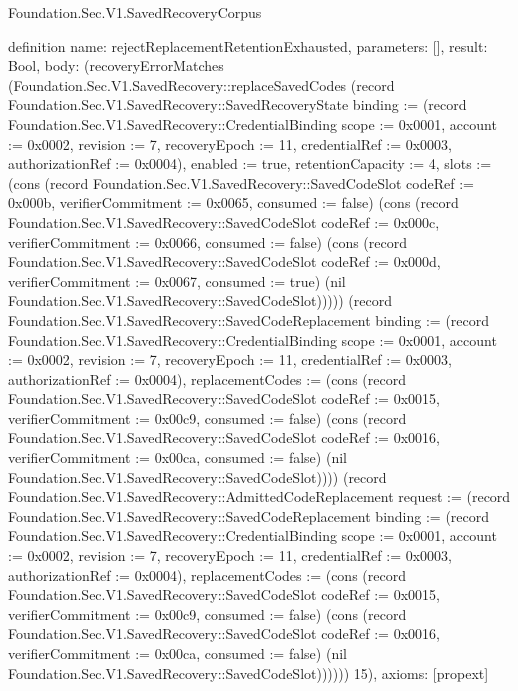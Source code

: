 \begin{lexlean}{Foundation.Sec.V1.SavedRecoveryCorpus}
\begin{semanticmodule}
definition{
  name: rejectReplacementRetentionExhausted,
  parameters: [],
  result: Bool,
  body: (recoveryErrorMatches (Foundation.Sec.V1.SavedRecovery::replaceSavedCodes (record Foundation.Sec.V1.SavedRecovery::SavedRecoveryState {binding := (record Foundation.Sec.V1.SavedRecovery::CredentialBinding {scope := 0x0001, account := 0x0002, revision := 7, recoveryEpoch := 11, credentialRef := 0x0003, authorizationRef := 0x0004}), enabled := true, retentionCapacity := 4, slots := (cons (record Foundation.Sec.V1.SavedRecovery::SavedCodeSlot {codeRef := 0x000b, verifierCommitment := 0x0065, consumed := false}) (cons (record Foundation.Sec.V1.SavedRecovery::SavedCodeSlot {codeRef := 0x000c, verifierCommitment := 0x0066, consumed := false}) (cons (record Foundation.Sec.V1.SavedRecovery::SavedCodeSlot {codeRef := 0x000d, verifierCommitment := 0x0067, consumed := true}) (nil Foundation.Sec.V1.SavedRecovery::SavedCodeSlot))))}) (record Foundation.Sec.V1.SavedRecovery::SavedCodeReplacement {binding := (record Foundation.Sec.V1.SavedRecovery::CredentialBinding {scope := 0x0001, account := 0x0002, revision := 7, recoveryEpoch := 11, credentialRef := 0x0003, authorizationRef := 0x0004}), replacementCodes := (cons (record Foundation.Sec.V1.SavedRecovery::SavedCodeSlot {codeRef := 0x0015, verifierCommitment := 0x00c9, consumed := false}) (cons (record Foundation.Sec.V1.SavedRecovery::SavedCodeSlot {codeRef := 0x0016, verifierCommitment := 0x00ca, consumed := false}) (nil Foundation.Sec.V1.SavedRecovery::SavedCodeSlot)))}) (record Foundation.Sec.V1.SavedRecovery::AdmittedCodeReplacement {request := (record Foundation.Sec.V1.SavedRecovery::SavedCodeReplacement {binding := (record Foundation.Sec.V1.SavedRecovery::CredentialBinding {scope := 0x0001, account := 0x0002, revision := 7, recoveryEpoch := 11, credentialRef := 0x0003, authorizationRef := 0x0004}), replacementCodes := (cons (record Foundation.Sec.V1.SavedRecovery::SavedCodeSlot {codeRef := 0x0015, verifierCommitment := 0x00c9, consumed := false}) (cons (record Foundation.Sec.V1.SavedRecovery::SavedCodeSlot {codeRef := 0x0016, verifierCommitment := 0x00ca, consumed := false}) (nil Foundation.Sec.V1.SavedRecovery::SavedCodeSlot)))})})) 15),
  axioms: [propext]
}


\end{semanticmodule}
\end{lexlean}

